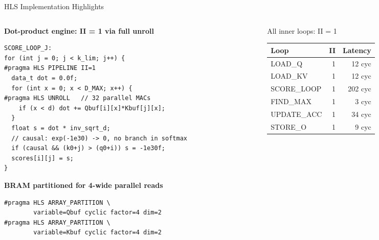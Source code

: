 \documentclass[aspectratio=169, 10pt]{beamer}
\begin{document}
\begin{frame}[fragile]{HLS Implementation Highlights}
  \begin{columns}[T]
    \begin{column}{0.50\textwidth}
      \textbf{Dot-product engine: II = 1 via full unroll}
      \vspace{2pt}
      \begin{lstlisting}
SCORE_LOOP_J:
for (int j = 0; j < k_lim; j++) {
#pragma HLS PIPELINE II=1
  data_t dot = 0.0f;
  for (int x = 0; x < D_MAX; x++) {
#pragma HLS UNROLL   // 32 parallel MACs
    if (x < d) dot += Qbuf[i][x]*Kbuf[j][x];
  }
  float s = dot * inv_sqrt_d;
  // causal: exp(-1e30) -> 0, no branch in softmax
  if (causal && (k0+j) > (q0+i)) s = -1e30f;
  scores[i][j] = s;
}
      \end{lstlisting}
      \vspace{4pt}
      \textbf{BRAM partitioned for 4-wide parallel reads}
      \begin{lstlisting}
#pragma HLS ARRAY_PARTITION \
        variable=Qbuf cyclic factor=4 dim=2
#pragma HLS ARRAY_PARTITION \
        variable=Kbuf cyclic factor=4 dim=2
      \end{lstlisting}
    \end{column}
    \begin{column}{0.46\textwidth}
      \begin{block}{All inner loops: II = 1}
        \vspace{2pt}
        \begin{tabular}{lrr}
          \toprule
          Loop         & II & Latency \\
          \midrule
          LOAD\_Q      &  1 & 12 cyc \\
          LOAD\_KV     &  1 & 12 cyc \\
          SCORE\_LOOP  &  1 & 202 cyc \\
          FIND\_MAX    &  1 &  3 cyc \\
          UPDATE\_ACC  &  1 & 34 cyc \\
          STORE\_O     &  1 &  9 cyc \\
          \bottomrule
        \end{tabular}
        \vspace{2pt}
      \end{block}


\end{column}
\end{columns}
\end{frame}
\end{document}
